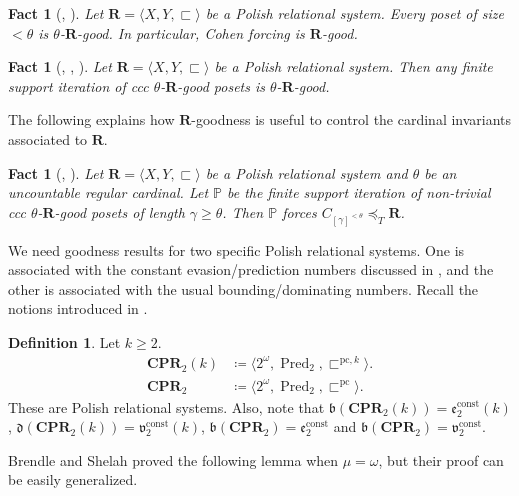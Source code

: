 \documentclass[a4paper,12pt]{amsart}
\newtheorem{fac}[thm]{Fact}
\theoremstyle{definition}
\newtheorem{dfn}[thm]{Definition}
\numberwithin{thm}{section}
\numberwithin{equation}{section}
\newcommand{\p}{\mathbb{P}}
\newcommand{\bb}{\mathfrak{b}}
\newcommand{\dd}{\mathfrak{d}}
\newcommand{\ee}{\mathfrak{e}}
\newcommand{\R}{\mathbf{R}}
\renewcommand{\lq}{\preceq_T}
\DeclareMathOperator{\Pred}{Pred}
\newcommand{\eec}{\ee^{\mathrm{const}}}
\newcommand{\vv}{\mathfrak{v}}
\newcommand{\vvc}{\vv^{\mathrm{const}}}
\newcommand{\pc}{\sqsubset^{\mathrm{pc}}}
\newcommand{\pck}{\sqsubset^{\mathrm{pc},k}}
\begin{document}
    \begin{fac}
    	[{\cite[Lemma 4]{Mej13}, \cite[Theorem 6.4.7]{BJ95}}]
        Let $\R=\langle X,Y,\sqsubset\rangle$ be a Polish relational system. Every poset of size $<\theta$ is $\theta$-$\R$-good. In particular, Cohen forcing is $\R$-good.
    \end{fac}
    
    \begin{fac}[{\cite{JS90}, \cite[Corollary 4.13]{CM19}, \cite[Corollary 4.10]{BCM25}}]\label{fac:goodness_iteration}
        Let $\R=\langle X,Y,\sqsubset\rangle$ be a Polish relational system. Then any finite support iteration of ccc $\theta$-$\R$-good posets is $\theta$-$\R$-good.
    \end{fac}
    
    The following explains how $\R$-goodness is useful to control the cardinal invariants associated to $\R$.
    
    \begin{fac}[{\cite[Lemma 2.15]{CM22}, \cite[Theorem 4.11]{BCM25}}]\label{fac:FM21}
        Let $\R=\langle X,Y,\sqsubset\rangle$ be a Polish relational system and $\theta$ be an uncountable regular cardinal. Let $\p$ be the finite support iteration of non-trivial ccc $\theta$-$\R$-good posets of length $\gamma\geq\theta$. Then $\p$ forces $C_{[\gamma]^{<\theta}}\lq\R$.
    \end{fac}
    		
    We need goodness results for two specific Polish relational systems. One is associated with the constant evasion/prediction numbers discussed in , and the other is associated with the usual bounding/dominating numbers. Recall the notions introduced in .
    
    \begin{dfn}
        Let $k\geq 2$.
        \begin{align*}
            \mathbf{CPR}_2(k) & \coloneqq\langle2^\omega,\Pred_2,\pck\rangle.\\
            \mathbf{CPR}_2 & \coloneqq\langle2^\omega,\Pred_2,\pc\rangle.
        \end{align*}
        These are Polish relational systems. Also, note that $\bb(\mathbf{CPR}_2(k))=\eec_2(k)$, $\dd(\mathbf{CPR}_2(k))=\vvc_2(k)$, $\bb(\mathbf{CPR}_2)=\eec_2$ and  $\bb(\mathbf{CPR}_2)=\vvc_2$.
    \end{dfn}
    
    Brendle and Shelah proved the following lemma when $\mu=\omega$, but their proof can be easily generalized.
    
\end{document}

